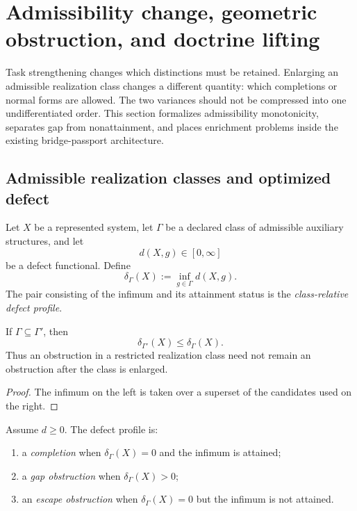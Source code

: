 \section{Admissibility change, geometric obstruction, and doctrine lifting}
\label{sec:block19-admissibility-lifting}

Task strengthening changes which distinctions must be retained.  Enlarging an admissible realization class changes a different quantity: which completions or normal forms are allowed.  The two variances should not be compressed into one undifferentiated order.  This section formalizes admissibility monotonicity, separates gap from nonattainment, and places enrichment problems inside the existing bridge-passport architecture.

\subsection{Admissible realization classes and optimized defect}
\label{subsec:block19-defect}

\begin{definition}
\label{def:block19-class-relative-defect}
Let \(X\) be a represented system, let \(\Gamma\) be a declared class of admissible auxiliary structures, and let
\[
 d(X,g)\in[0,\infty]
\]
be a defect functional.  Define
\[
 \delta_\Gamma(X):=\inf_{g\in\Gamma}d(X,g).
\]
The pair consisting of the infimum and its attainment status is the \emph{class-relative defect profile}.
\end{definition}

\begin{theorem}
\label{thm:block19-admissibility-monotonicity}
If \(\Gamma\subseteq\Gamma'\), then
\[
 \delta_{\Gamma'}(X)\leq\delta_\Gamma(X).
\]
Thus an obstruction in a restricted realization class need not remain an obstruction after the class is enlarged.
\end{theorem}

\begin{proof}
The infimum on the left is taken over a superset of the candidates used on the right.
\end{proof}

\begin{definition}
\label{def:block19-trichotomy}
Assume \(d\geq0\).  The defect profile is:
\begin{enumerate}[label=\textup{(\roman*)}]
\item a \emph{completion} when \(\delta_\Gamma(X)=0\) and the infimum is attained;
\item a \emph{gap obstruction} when \(\delta_\Gamma(X)>0\);
\item an \emph{escape obstruction} when \(\delta_\Gamma(X)=0\) but the infimum is not attained.
\end{enumerate}
\end{definition}

